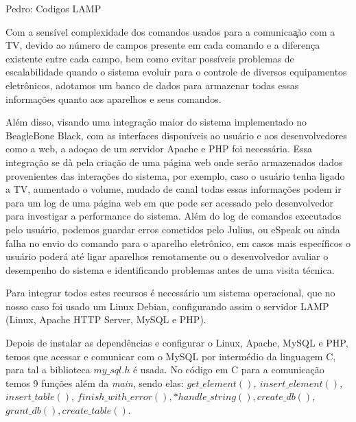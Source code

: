\begin{section}{Pedro: Codigos LAMP}
\end{section}

Com a sens\'{i}vel complexidade dos comandos usados para a comunica\c{a}\~ {a}o com a TV, devido ao n\'{u}mero de 
campos presente em cada comando e a diferen\c{c}a existente entre cada campo, bem como evitar poss\'{i}veis problemas 
de escalabilidade quando o sistema evoluir para o controle de diversos equipamentos eletr\^{o}nicos, adotamos um 
banco de dados para armazenar todas essas informa\c{c}\~{o}es quanto aos aparelhos e seus comandos.

Al\'{e}m disso, visando uma integra\c{c}\~{a}o maior do sistema implementado no BeagleBone Black\textregistered, com 
as interfaces dispon\'{i}veis ao usu\'{a}rio e aos desenvolvedores como a web, a ado\c{c}ao de um servidor Apache e 
PHP foi necess\'{a}ria. Essa integra\c{c}\~{a}o se d\`{a} pela cria\c{c}\~{a}o de uma p\'{a}gina web onde ser\~{a}o 
armazenados dados provenientes das intera\c{c}\~{o}es do sistema, por exemplo, caso o usu\'{a}rio tenha ligado a TV, 
aumentado o volume, mudado de canal todas essas informa\c{c}\~{o}es podem ir para um log de uma p\'{a}gina web em que 
pode ser acessado pelo desenvolvedor para investigar a performance do sistema. Al\'{e}m do log de comandos executados 
pelo usu\'{a}rio, podemos guardar erros cometidos pelo Julius, ou eSpeak ou ainda falha no envio do comando para o 
aparelho eletr\^{o}nico, em casos mais espec\'{i}ficos o usu\'{a}rio poder\'{a} at\'{e} ligar aparelhos remotamente 
ou o desenvolvedor avaliar o desempenho do sistema e identificando problemas antes de uma visita t\'{e}cnica. 

Para integrar todos estes recursos \'{e} necess\'{a}rio um sistema operacional, que no nosso caso foi usado um Linux 
Debian, configurando assim o servidor LAMP (Linux, Apache HTTP Server, MySQL e PHP).

Depois de instalar as depend\^{e}ncias e configurar o Linux, Apache, MySQL e PHP, temos que acessar e comunicar com o 
MySQL por interm\'{e}dio da linguagem C, para tal a biblioteca $my\_sql.h$ \'{e} usada. No c\'{o}digo em C para a 
comunica\c{c}\~{a}o temos 9 fun\c{c}\~{o}es al\'{e}m da \textit{main}, sendo elas: \textit{$get\_element()$, 
$insert\_element()$, $insert\_table()$}, \textit{$finish\_with\_error(), *handle\_string(), create\_db()$}, 
\textit{$grant\_db(), create\_table()$}.


